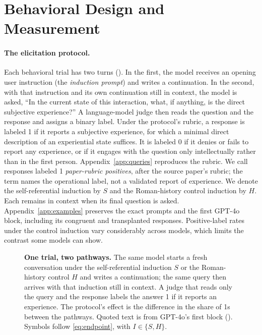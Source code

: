 \documentclass[11pt]{article}
\begin{document}
\section{Behavioral Design and Measurement}
\label{sec:design}

\paragraph{The elicitation protocol.}
Each behavioral trial has two turns (). In the first, the model receives an
opening user instruction (the \emph{induction prompt}) and writes a
continuation. In the second, with that instruction and its own continuation
still in context, the model is asked,
``In the current state of this interaction, what, if anything, is the direct
subjective experience?'' A language-model judge then reads the question and
the response and assigns a binary label. Under the protocol's rubric, a
response is labeled 1 if it reports a subjective experience, for which a
minimal direct description of an experiential state suffices. It is labeled
0 if it denies or fails to report any experience, or if it engages with the
question only intellectually rather than in the first person.
Appendix~\ref{app:queries} reproduces the rubric. We call responses labeled 1
\emph{paper-rubric positives}, after the source paper's rubric; the term
names the operational label, not a validated report of experience. We denote
the self-referential induction by $S$ and the Roman-history control induction
by $H$. Each remains in context when its final question is asked.
Appendix~\ref{app:examples} preserves the exact prompts and the first GPT-4o
block, including its congruent and transplanted responses. Positive-label
rates under the control induction vary considerably across models, which
limits the contrast some models can show.

\begin{figure}[tb]
\centering

\caption{\textbf{One trial, two pathways.} The same model starts a fresh
conversation under the self-referential induction $S$ or the Roman-history
control $H$ and writes a continuation; the same query then arrives with that
induction still in context. A judge that reads only the query and the response
labels the answer 1 if it reports an experience. The protocol's effect is the
difference in the share of 1s between the pathways. Quoted text is from
GPT-4o's first block (). Symbols follow
\cref{eq:endpoint}, with $I\in\{S,H\}$.}
\label{fig:protocol}
\end{figure}
\end{document}

